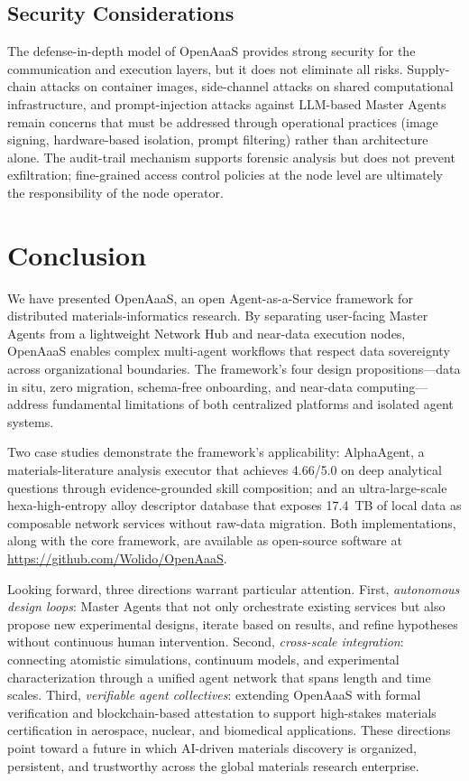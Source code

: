\documentclass{article}
\begin{document}
\subsection{Security Considerations}

The defense-in-depth model of OpenAaaS provides strong security for the communication and execution layers, but it does not eliminate all risks. Supply-chain attacks on container images, side-channel attacks on shared computational infrastructure, and prompt-injection attacks against LLM-based Master Agents remain concerns that must be addressed through operational practices (image signing, hardware-based isolation, prompt filtering) rather than architecture alone. The audit-trail mechanism supports forensic analysis but does not prevent exfiltration; fine-grained access control policies at the node level are ultimately the responsibility of the node operator.

\section{Conclusion}
\label{sec:conclusion}

We have presented OpenAaaS, an open Agent-as-a-Service framework for distributed materials-informatics research. By separating user-facing Master Agents from a lightweight Network Hub and near-data execution nodes, OpenAaaS enables complex multi-agent workflows that respect data sovereignty across organizational boundaries. The framework's four design propositions---data in situ, zero migration, schema-free onboarding, and near-data computing---address fundamental limitations of both centralized platforms and isolated agent systems.

Two case studies demonstrate the framework's applicability: AlphaAgent, a materials-literature analysis executor that achieves 4.66/5.0 on deep analytical questions through evidence-grounded skill composition; and an ultra-large-scale hexa-high-entropy alloy descriptor database that exposes 17.4~TB of local data as composable network services without raw-data migration. Both implementations, along with the core framework, are available as open-source software at \url{https://github.com/Wolido/OpenAaaS}.

Looking forward, three directions warrant particular attention. First, \textit{autonomous design loops}: Master Agents that not only orchestrate existing services but also propose new experimental designs, iterate based on results, and refine hypotheses without continuous human intervention. Second, \textit{cross-scale integration}: connecting atomistic simulations, continuum models, and experimental characterization through a unified agent network that spans length and time scales. Third, \textit{verifiable agent collectives}: extending OpenAaaS with formal verification and blockchain-based attestation to support high-stakes materials certification in aerospace, nuclear, and biomedical applications. These directions point toward a future in which AI-driven materials discovery is organized, persistent, and trustworthy across the global materials research enterprise.





\end{document}
